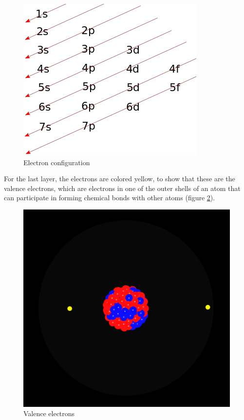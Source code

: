\documentclass{article}
\begin{document}
\begin{figure}[!ht]
\centering
\includegraphics[scale=0.4]{electron_configuration.png}
\caption{Electron configuration}
\label{fig:fig2}
\end{figure}

For the last layer, the electrons are colored yellow, to show that these are the valence electrons, which are electrons in one of the outer shells of an atom that can participate in forming chemical bonds with other atoms (figure \ref{fig:fig3}).

\begin{figure}[!ht]
\centering
\includegraphics[scale=0.4]{valence_electrons.png}
\caption{Valence electrons}
\label{fig:fig3}
\end{figure}
\end{document}
